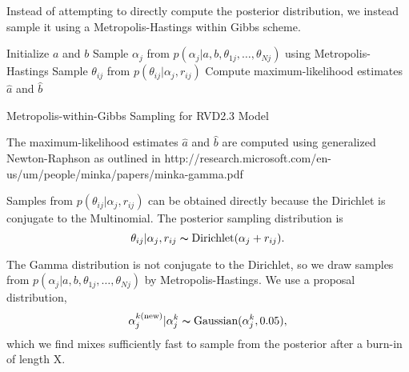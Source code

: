 \documentclass[10pt, letterpaper]{article}
\begin{document}
Instead of attempting to directly compute the posterior distribution, we instead sample it using  a Metropolis-Hastings within Gibbs scheme.

\begin{algorithm}[H]
\SetAlgoLined
{}
Initialize $a$ and $b$\;
 {
	Sample $\alpha_j$ from $p(\alpha_j | a, b, \theta_{1j}, \ldots, \theta_{Nj})$ using Metropolis-Hastings\;
	Sample $\theta_{ij}$ from $p(\theta_{ij} | \alpha_j, r_{ij})$\;
	Compute maximum-likelihood estimates $\hat{a}$ and $\hat{b}$
}
\caption{Metropolis-within-Gibbs Sampling for RVD2.3 Model}
\end{algorithm}

The maximum-likelihood estimates $\hat{a}$ and $\hat{b}$ are computed using generalized Newton-Raphson as outlined in http://research.microsoft.com/en-us/um/people/minka/papers/minka-gamma.pdf

Samples from $p(\theta_{ij} | \alpha_j, r_{ij})$ can be obtained directly because the Dirichlet is conjugate to the Multinomial. The posterior sampling distribution is
\begin{equation}
	\theta_{ij} | \alpha_j, r_{ij} \thicksim \text{Dirichlet}(\alpha_j + r_{ij}).
\end{equation}

The Gamma distribution is not conjugate to the Dirichlet, so we draw samples from $p(\alpha_j | a, b, \theta_{1j}, \ldots, \theta_{Nj})$ by Metropolis-Hastings. We use a proposal distribution,
\begin{equation}
	\alpha_j^{k \text{(new)}} | \alpha_j^k \thicksim \text{Gaussian}(\alpha_j^k, 0.05),
\end{equation}
which we find mixes sufficiently fast to sample from the posterior after a burn-in of length X.
	
\end{document}
